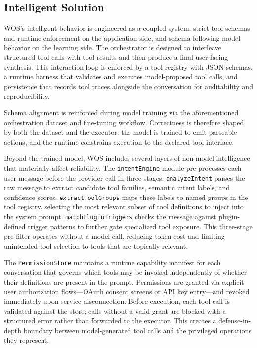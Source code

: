 \documentclass[conference]{IEEEtran}
\begin{document}
\subsection{Intelligent Solution}
WOS’s intelligent behavior is engineered as a coupled system: strict tool schemas and runtime enforcement on the application side, and schema-following model behavior on the learning side. The orchestrator is designed to interleave structured tool calls with tool results and then produce a final user-facing synthesis. This interaction loop is enforced by a tool registry with JSON schemas, a runtime harness that validates and executes model-proposed tool calls, and persistence that records tool traces alongside the conversation for auditability and reproducibility.

Schema alignment is reinforced during model training via the aforementioned orchestration dataset and fine-tuning workflow. Correctness is therefore shaped by both the dataset and the executor: the model is trained to emit parseable actions, and the runtime constrains execution to the declared tool interface.

Beyond the trained model, WOS includes several layers of non-model intelligence that materially affect reliability. The \texttt{intentEngine} module pre-processes each user message before the provider call in three stages. \texttt{analyzeIntent} parses the raw message to extract candidate tool families, semantic intent labels, and confidence scores. \texttt{extractToolGroups} maps these labels to named groups in the tool registry, selecting the most relevant subset of tool definitions to inject into the system prompt. \texttt{matchPluginTriggers} checks the message against plugin-defined trigger patterns to further gate specialized tool exposure. This three-stage pre-filter operates without a model call, reducing token cost and limiting unintended tool selection to tools that are topically relevant.

The \texttt{PermissionStore} maintains a runtime capability manifest for each conversation that governs which tools may be invoked independently of whether their definitions are present in the prompt. Permissions are granted via explicit user authorization flows---OAuth consent screens or API key entry---and revoked immediately upon service disconnection. Before execution, each tool call is validated against the store; calls without a valid grant are blocked with a structured error rather than forwarded to the executor. This creates a defense-in-depth boundary between model-generated tool calls and the privileged operations they represent.
\end{document}
